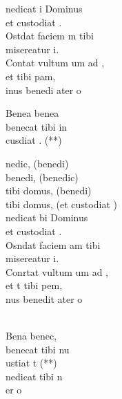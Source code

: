 \begin{cancion}[Benedicat][]%
	nedicat i Dominus  \\
	et custodiat .\\
	Ostdat faciem m tibi\\
	 misereatur i.\\
	Contat vultum um ad ,\\
	et  tibi pam,\\
	inus benedi ater o  \jump\\
	\begin{chorus}%
		Benea     benea  \\
		benecat tibi in \\
		 cusdiat . (**)\jump\\
	\end{chorus}%
	nedic, (benedi)\\
	benedi, (benedic)\\
	tibi domus, (benedi)\\
	tibi domus, (et custodiat )\\
	\jump
	nedicat bi Dominus \\
	et custodiat .\\
	Osndat faciem am tibi\\
	 misereatur i.\\
	Conrtat vultum um ad ,\\
	et t tibi pem,\\
	nus benedit ater o  \\
	\jumjump\\
	\begin{chorus}%
		Bena     benec,\chord{Si}{}{  } \\
		benecat tibi nu\chord{La}{}{s,} \\
		ustiat t (**)\\
	\jump
		nedicat tibi n\chord{Sol}{}{us } \\
		er o  \jump\\
	\end{chorus}%
	\jump
	\jump
	\jump
\end{cancion}%
